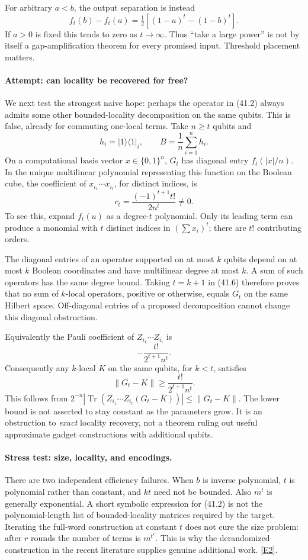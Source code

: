 \documentclass[11pt,a4paper]{article}
\newcommand{\eref}[2]{\hyperlink{extra:#1:#2}{[E#2]}}
\numberwithin{equation}{section}
\begin{document}
For arbitrary $a<b$, the output separation is instead
\[
 f_t(b)-f_t(a)=\tfrac12[(1-a)^t-(1-b)^t].            \tag{41.5}
\]
If $a>0$ is fixed this tends to zero as $t\to\infty$. Thus ``take a large
power'' is not by itself a gap-amplification theorem for every promised
input. Threshold placement matters.

\paragraph{Attempt: can locality be recovered for free?}
We next test the strongest naive hope: perhaps the operator in (41.2)
always admits some other bounded-locality decomposition on the same
qubits. This is false, already for commuting one-local terms.
Take $n\ge t$ qubits and
\[
 h_i=|1\rangle\langle1|_i,\qquad B=\frac1n\sum_{i=1}^n h_i.
\]
On a computational basis vector $x\in\{0,1\}^n$, $G_t$ has diagonal
entry $f_t(|x|/n)$. In the unique multilinear polynomial representing
this function on the Boolean cube, the coefficient of
$x_{i_1}\cdots x_{i_t}$, for distinct indices, is
\[
 c_t=\frac{(-1)^{t+1}t!}{2n^t}\ne0.               \tag{41.6}
\]
To see this, expand $f_t(u)$ as a degree-$t$ polynomial. Only its leading
term can produce a monomial with $t$ distinct indices in
$(\sum x_i)^t$; there are $t!$ contributing orders.

The diagonal entries of an operator supported on at most $k$ qubits
depend on at most $k$ Boolean coordinates and have multilinear degree at
most $k$. A sum of such operators has the same degree bound. Taking
$t=k+1$ in (41.6) therefore proves that no sum of $k$-local operators,
positive or otherwise, equals $G_t$ on the same Hilbert space.
Off-diagonal entries of a proposed decomposition cannot change this
diagonal obstruction.

Equivalently the Pauli coefficient of
$Z_{i_1}\cdots Z_{i_t}$ is
\[
 -\frac{t!}{2^{t+1}n^t}.
 \tag{41.7}
\]
Consequently any $k$-local $K$ on the same qubits, for $k<t$, satisfies
\[
 \|G_t-K\|\ge \frac{t!}{2^{t+1}n^t}.
\]
This follows from
$2^{-n}|\operatorname{Tr}(Z_{i_1}\cdots Z_{i_t}(G_t-K))|
\le\|G_t-K\|$. The lower bound is not asserted to stay constant as the
parameters grow. It is an obstruction to \emph{exact} locality recovery,
not a theorem ruling out useful approximate gadget constructions with
additional qubits.

\paragraph{Stress test: size, locality, and encodings.}
There are two independent efficiency failures. When $b$ is inverse
polynomial, $t$ is polynomial rather than constant, and $kt$ need not be
bounded. Also $m^t$ is generally exponential. A short symbolic expression
for (41.2) is not the polynomial-length list of bounded-locality matrices
required by the target. Iterating the full-word construction at constant
$t$ does not cure the size problem: after $r$ rounds the number of terms
is $m^{t^r}$. This is why the derandomized construction in the recent
literature supplies genuine additional work. \eref{statement}{2}.
\end{document}

